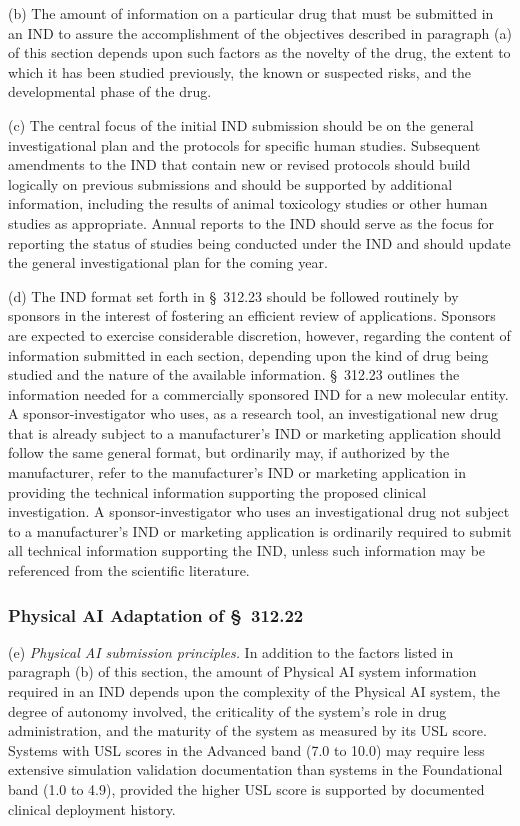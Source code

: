 (b) The amount of information on a particular drug that must be submitted in an IND to assure the accomplishment of the objectives described in paragraph (a) of this section depends upon such factors as the novelty of the drug, the extent to which it has been studied previously, the known or suspected risks, and the developmental phase of the drug.

(c) The central focus of the initial IND submission should be on the general investigational plan and the protocols for specific human studies. Subsequent amendments to the IND that contain new or revised protocols should build logically on previous submissions and should be supported by additional information, including the results of animal toxicology studies or other human studies as appropriate. Annual reports to the IND should serve as the focus for reporting the status of studies being conducted under the IND and should update the general investigational plan for the coming year.

(d) The IND format set forth in \S~312.23 should be followed routinely by sponsors in the interest of fostering an efficient review of applications. Sponsors are expected to exercise considerable discretion, however, regarding the content of information submitted in each section, depending upon the kind of drug being studied and the nature of the available information. \S~312.23 outlines the information needed for a commercially sponsored IND for a new molecular entity. A sponsor-investigator who uses, as a research tool, an investigational new drug that is already subject to a manufacturer's IND or marketing application should follow the same general format, but ordinarily may, if authorized by the manufacturer, refer to the manufacturer's IND or marketing application in providing the technical information supporting the proposed clinical investigation. A sponsor-investigator who uses an investigational drug not subject to a manufacturer's IND or marketing application is ordinarily required to submit all technical information supporting the IND, unless such information may be referenced from the scientific literature.

\subsubsection{Physical AI Adaptation of \S~312.22}

(e) \textit{Physical AI submission principles.} In addition to the factors listed in paragraph (b) of this section, the amount of Physical AI system information required in an IND depends upon the complexity of the Physical AI system, the degree of autonomy involved, the criticality of the system's role in drug administration, and the maturity of the system as measured by its USL score. Systems with USL scores in the Advanced band (7.0 to 10.0) may require less extensive simulation validation documentation than systems in the Foundational band (1.0 to 4.9), provided the higher USL score is supported by documented clinical deployment history.

